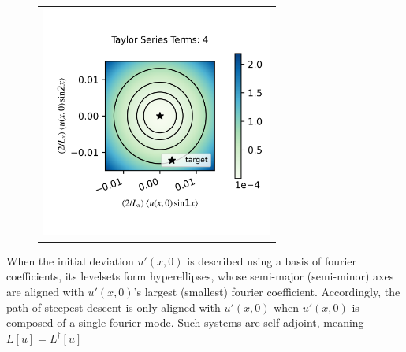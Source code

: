 \documentclass[longbibliography,amsmath,amssymb,aps,nofootinbib]{revtex4-2}
\newcommand\Ra{\mathrm{Ra}}
\begin{document}
\begin{figure}[h]
\begin{tabular}{@{}c@{}}
  \end{tabular}
  \begin{tabular}{@{}c@{}}
      \includegraphics[width=3in]{SPHRtest_Nts4a0p3b0p0c0p0T1p0R0p015kt10p0kt20.png}
  \end{tabular}
\end{figure}

\clearpage
When the initial deviation $u'(x, 0)$ is described using a basis of fourier coefficients, its levelsets form hyperellipses, whose semi-major (semi-minor) axes are aligned with $u'(x, 0)$'s largest (smallest) fourier coefficient.
Accordingly, the path of steepest descent is only aligned with $u'(x, 0)$ when $u'(x, 0)$ is composed of a single fourier mode. Such systems are self-adjoint, meaning $L[u] = L^{\dagger}[u]$
\end{document}
